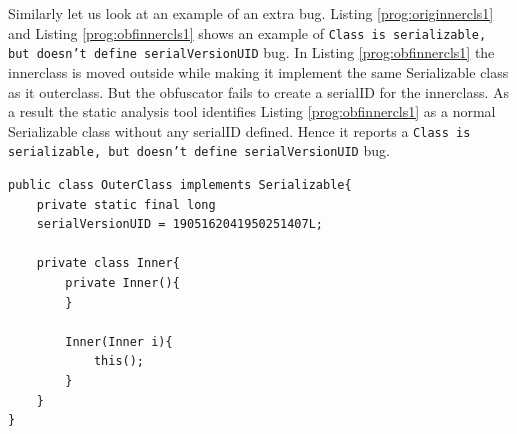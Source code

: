 \documentclass[twocolumn]{article}
\begin{document}
Similarly let us look at an example of an extra bug. Listing \ref{prog:originnercls1} and Listing \ref{prog:obfinnercls1} shows an example of {\tt Class is serializable, but doesn’t 
define serialVersionUID} bug. In Listing \ref{prog:obfinnercls1} the innerclass is moved outside while making it implement the same Serializable class as it outerclass. But the obfuscator 
fails to create a serialID for the innerclass. As a result the static analysis tool identifies Listing \ref{prog:obfinnercls1} as a normal Serializable class without any serialID defined. 
Hence it reports a {\tt Class is serializable, but doesn’t define serialVersionUID} bug.
\tiny\begin{lstlisting}[frame=single]
 public class OuterClass implements Serializable{
	private static final long 
	serialVersionUID = 1905162041950251407L;
	
	private class Inner{
		private Inner(){
		}
		
		Inner(Inner i){
			this();
		}
	}
}
\end{lstlisting}
\normalsize
\end{document}
